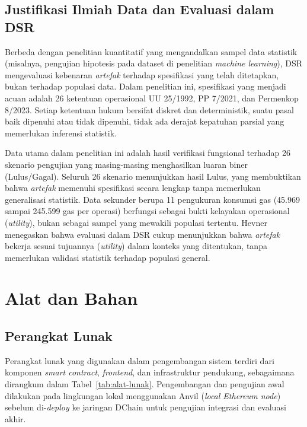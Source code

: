 \subsection{Justifikasi Ilmiah Data dan Evaluasi dalam DSR}

Berbeda dengan penelitian kuantitatif yang mengandalkan sampel data statistik (misalnya, pengujian hipotesis pada dataset di penelitian \textit{machine learning}), DSR mengevaluasi kebenaran \textit{artefak} terhadap spesifikasi yang telah ditetapkan, bukan terhadap populasi data. Dalam penelitian ini, spesifikasi yang menjadi acuan adalah 26 ketentuan operasional UU 25/1992, PP 7/2021, dan Permenkop 8/2023. Setiap ketentuan hukum bersifat diskret dan deterministik, suatu pasal baik dipenuhi atau tidak dipenuhi, tidak ada derajat kepatuhan parsial yang memerlukan inferensi statistik.

Data utama dalam penelitian ini adalah hasil verifikasi fungsional terhadap 26 skenario pengujian yang masing-masing menghasilkan luaran biner (Lulus/Gagal). Seluruh 26 skenario menunjukkan hasil Lulus, yang membuktikan bahwa \textit{artefak} memenuhi spesifikasi secara lengkap tanpa memerlukan generalisasi statistik. Data sekunder berupa 11 pengukuran konsumsi gas (45.969 sampai 245.599 gas per operasi) berfungsi sebagai bukti kelayakan operasional (\textit{utility}), bukan sebagai sampel yang mewakili populasi tertentu. Hevner~\cite{hevner2004design} menegaskan bahwa evaluasi dalam DSR cukup menunjukkan bahwa \textit{artefak} bekerja sesuai tujuannya (\textit{utility}) dalam konteks yang ditentukan, tanpa memerlukan validasi statistik terhadap populasi general.

\section{Alat dan Bahan}

\subsection{Perangkat Lunak}

Perangkat lunak yang digunakan dalam pengembangan sistem terdiri dari komponen \textit{smart contract}, \textit{frontend}, dan infrastruktur pendukung, sebagaimana dirangkum dalam Tabel~\ref{tab:alat-lunak}. Pengembangan dan pengujian awal dilakukan pada lingkungan lokal menggunakan Anvil (\textit{local Ethereum node}) sebelum di-\textit{deploy} ke jaringan DChain untuk pengujian integrasi dan evaluasi akhir.

